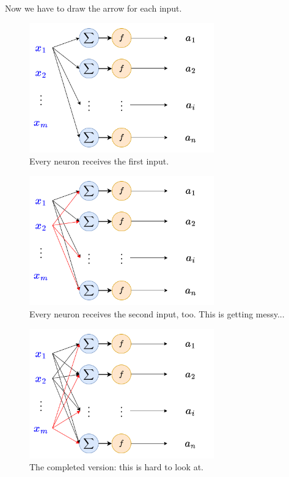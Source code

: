         Now we have to draw the arrow for each input.
        
        \begin{figure}[H]
            \centering
            \includegraphics[width=80mm,scale=0.4]{images/nn_images/layers_one_neuron_input.png}
            \caption*{Every neuron receives the first input.}
        \end{figure}
        
        \begin{figure}[H]
            \centering
            \includegraphics[width=80mm,scale=0.4]{images/nn_images/layers_two_neuron_input.png}
            \caption*{Every neuron receives the second input, too. This is getting messy...}
        \end{figure}
        
        \begin{figure}[H]
            \centering
            \includegraphics[width=80mm,scale=0.4]{images/nn_images/layers_all_neuron_input.png}
            \caption*{The completed version: this is hard to look at.}
        \end{figure}
        
